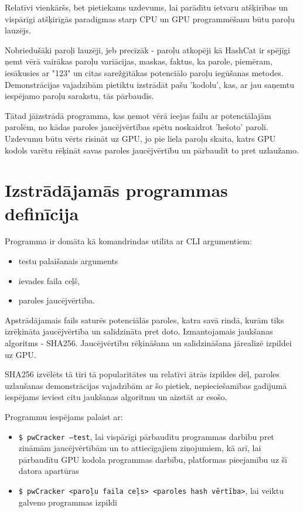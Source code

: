 \documentclass[12pt]{report}%
\theoremstyle{definition}
\begin{document}
Relatīvi vienkāršs, bet pietiekams uzdevums, lai parādītu ietvaru atšķirības un vispārīgi atšķirīgās
paradigmas starp CPU un GPU programmēšanu būtu paroļu lauzējs.

Nobriedušāki paroļi lauzēji, jeb precīzāk - paroļu atkopēji kā HashCat ir spējīgi ņemt vērā vairākas paroļu
variācijas, maskas, faktus, ka parole, piemēram, iesākusies ar "123" un citas sarežģītākas potenciālo paroļu
iegūšanas metodes. Demonstrācijas vajadzībām pietiktu izstrādāt pašu 'kodolu', kas, ar jau saņemtu
iespējamo paroļu sarakstu, tās pārbaudīs.


Tātad jāizstrādā programma, kas ņemot vērā ieejas failu ar potenciālajām parolēm, no kādas paroles
jaucējvērtības spētu noskaidrot 'hešoto' paroli.
Uzdevumu būtu vērts risināt uz GPU, jo pie liela paroļu skaita, katrs GPU kodols varētu rēķināt savas
paroles jaucējvērtību un pārbaudīt to pret uzlaužamo.

\section{Izstrādājamās programmas definīcija}
Programma ir domāta kā komandrindas utilīta ar CLI argumentiem:
\begin{itemize}
  \item testu palaišanais arguments
  \item ievades faila ceļš,
  \item paroles jaucējvērtība.
\end{itemize}

Apstrādājamais fails saturēs potenciālās paroles, katra savā rindā, kurām tiks izrēķināta jaucējvērtība un
salīdzināta pret doto. Izmantojamais jaukšanas algoritms - SHA256. Jaucējvērtību rēķināšana un salīdzināšana
jārealizē izpildei uz GPU.

SHA256 izvēlēts tā tīri tā popularitātes un relatīvi ātrās izpildes dēļ, paroles uzlaušanas demonstrācijas
vajadzībām ar šo pietiek, nepieciešamības gadījumā iespējams ieviest citu jaukšanas algoritmu un aizstāt
ar esošo.


Programmu iespējams palaist ar:
\begin{itemize}
  \item \texttt{\$ pwCracker --test}, lai vispārīgi pārbaudītu programmas darbību pret zināmām jaucējvērtībām
  un to attiecīgajiem ziņojumiem, kā arī, lai pārbaudītu GPU kodola programmas darbību, platformas
  pieejamību uz šī datora apartūras
  \item \texttt{\$ pwCracker <paroļu faila ceļs> <paroles hash vērtība>}, lai veiktu galveno programmas izpildi
\end{itemize}
\end{document}
